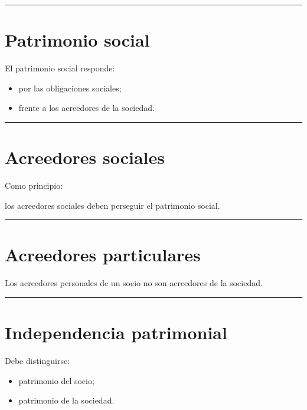 \documentclass[
  spanish,
  letterpaper,
  DIV=11,
  numbers=noendperiod]{scrartcl}
\providecommand{\tightlist}{%
  \setlength{\itemsep}{0pt}\setlength{\parskip}{0pt}}
\begin{document}
\begin{center}\rule{0.5\linewidth}{0.5pt}\end{center}

\section{Patrimonio social}\label{patrimonio-social}

El patrimonio social responde:

\begin{itemize}
\tightlist
\item
  por las obligaciones sociales;
\item
  frente a los acreedores de la sociedad.
\end{itemize}

\begin{center}\rule{0.5\linewidth}{0.5pt}\end{center}

\section{Acreedores sociales}\label{acreedores-sociales}

Como principio:

los acreedores sociales deben perseguir el patrimonio social.

\begin{center}\rule{0.5\linewidth}{0.5pt}\end{center}

\section{Acreedores particulares}\label{acreedores-particulares}

Los acreedores personales de un socio no son acreedores de la sociedad.

\begin{center}\rule{0.5\linewidth}{0.5pt}\end{center}

\section{Independencia patrimonial}\label{independencia-patrimonial}

Debe distinguirse:

\begin{itemize}
\tightlist
\item
  patrimonio del socio;
\item
  patrimonio de la sociedad.
\end{itemize}
\end{document}
